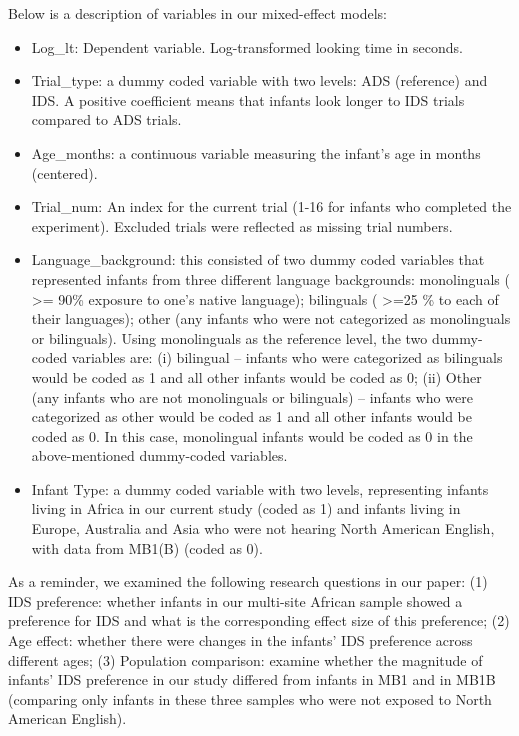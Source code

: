 \documentclass[
  ,man,floatsintext]{apa6}
\providecommand{\tightlist}{%
  \setlength{\itemsep}{0pt}\setlength{\parskip}{0pt}}
\begin{document}
Below is a description of variables in our mixed-effect models:

\begin{itemize}
\tightlist
\item
  Log\_lt: Dependent variable. Log-transformed looking time in seconds.
\item
  Trial\_type: a dummy coded variable with two levels: ADS (reference) and IDS. A positive coefficient means that infants look longer to IDS trials compared to ADS trials.
\item
  Age\_months: a continuous variable measuring the infant's age in months (centered).
\item
  Trial\_num: An index for the current trial (1-16 for infants who completed the experiment). Excluded trials were reflected as missing trial numbers.
\item
  Language\_background: this consisted of two dummy coded variables that represented infants from three different language backgrounds: monolinguals ( \textgreater= 90\% exposure to one's native language); bilinguals ( \textgreater=25 \% to each of their languages); other (any infants who were not categorized as monolinguals or bilinguals). Using monolinguals as the reference level, the two dummy-coded variables are: (i) bilingual -- infants who were categorized as bilinguals would be coded as 1 and all other infants would be coded as 0; (ii) Other (any infants who are not monolinguals or bilinguals) -- infants who were categorized as other would be coded as 1 and all other infants would be coded as 0. In this case, monolingual infants would be coded as 0 in the above-mentioned dummy-coded variables.
\item
  Infant Type: a dummy coded variable with two levels, representing infants living in Africa in our current study (coded as 1) and infants living in Europe, Australia and Asia who were not hearing North American English, with data from MB1(B) (coded as 0).
\end{itemize}

As a reminder, we examined the following research questions in our paper: (1) IDS preference: whether infants in our multi-site African sample showed a preference for IDS and what is the corresponding effect size of this preference; (2) Age effect: whether there were changes in the infants' IDS preference across different ages; (3) Population comparison: examine whether the magnitude of infants' IDS preference in our study differed from infants in MB1 and in MB1B (comparing only infants in these three samples who were not exposed to North American English).
\end{document}

